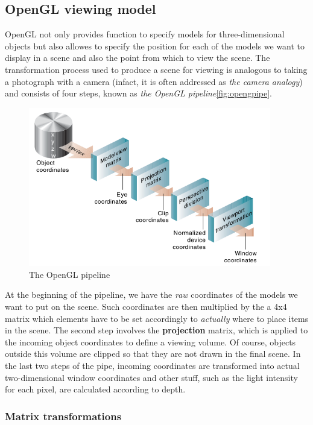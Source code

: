 %
\subsection{OpenGL viewing model}
OpenGL not only provides function to specify models for 
three-dimensional objects but also allowes to specify the 
position for each of the models we want to display in a 
scene and also the point from which to view the scene.
%
The transformation process used to produce a scene for viewing 
is analogous to taking a photograph with a camera (infact, it 
is often addressed as \textit{the camera analogy}) and consists 
of four steps, known as \textit{the OpenGL pipeline}\ref{fig:opengpipe}.
%
\begin{figure}[!h]
  \begin{center}
    \includegraphics[width=300pt]{img/openGLpipe}
    \caption{The OpenGL pipeline}
    \label{fig:openglpipe}
  \end{center}
\end{figure}
%
At the beginning of the pipeline, we have the \textit{raw} 
coordinates of the models we want to put on the scene. Such 
coordinates are then multiplied by the a 4x4  
matrix which elements have to be set accordingly to \textit{actually} 
where to place items in the scene.
%
The second step involves the \textbf{projection} matrix, 
which is applied to the incoming object coordinates to define a 
viewing volume. Of course, objects outside this volume are clipped 
so that they are not drawn in the final scene. 
%
In the last two steps of the pipe, incoming coordinates are transformed 
into actual two-dimensional window coordinates and other stuff, such as 
the light intensity for each pixel, are calculated according to depth.
%
\subsubsection{Matrix transformations}


